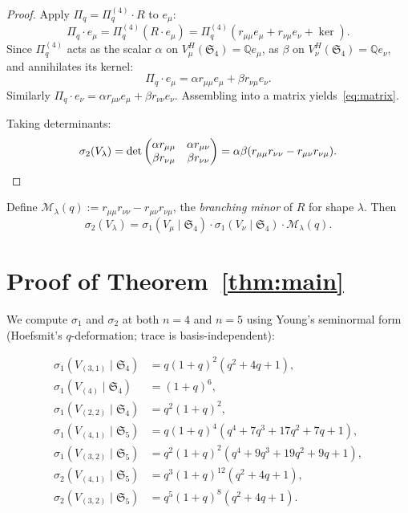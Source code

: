 \documentclass[11pt]{article}
\theoremstyle{plain}
\theoremstyle{definition}
\theoremstyle{remark}
\newcommand{\Q}{\mathbb{Q}}
\newcommand{\Sym}{\mathfrak{S}}
\newcommand{\Pibs}{\Pi_q}
\begin{document}
\begin{proof}
Apply $\Pibs = \Pibs^{(4)} \cdot R$ to $e_\mu$:
\[ \Pibs \cdot e_\mu = \Pibs^{(4)} (R \cdot e_\mu) = \Pibs^{(4)}(r_{\mu\mu} e_\mu + r_{\nu\mu} e_\nu + \ker). \]
Since $\Pibs^{(4)}$ acts as the scalar $\alpha$ on $V_\mu^H(\Sym_4) = \Q e_\mu$,
as $\beta$ on $V_\nu^H(\Sym_4) = \Q e_\nu$, and annihilates its kernel:
\[ \Pibs \cdot e_\mu = \alpha r_{\mu\mu} e_\mu + \beta r_{\nu\mu} e_\nu. \]
Similarly $\Pibs \cdot e_\nu = \alpha r_{\mu\nu} e_\mu + \beta r_{\nu\nu} e_\nu$.
Assembling into a matrix yields~\eqref{eq:matrix}.

Taking determinants:
\[ \sigma_2(V_\lambda) = \det \begin{pmatrix} \alpha r_{\mu\mu} & \alpha r_{\mu\nu} \\ \beta r_{\nu\mu} & \beta r_{\nu\nu} \end{pmatrix} = \alpha \beta (r_{\mu\mu} r_{\nu\nu} - r_{\mu\nu} r_{\nu\mu}). \qedhere \]
\end{proof}

Define $\mathcal{M}_\lambda(q) := r_{\mu\mu} r_{\nu\nu} - r_{\mu\nu} r_{\nu\mu}$,
the \emph{branching minor} of $R$ for shape $\lambda$. Then
\begin{equation}\sigma_2(V_\lambda) = \sigma_1(V_\mu \mid \Sym_4) \cdot \sigma_1(V_\nu \mid \Sym_4) \cdot \mathcal{M}_\lambda(q). \label{eq:factorization}\end{equation}

\section{Proof of Theorem~\ref{thm:main}}

We compute $\sigma_1$ and $\sigma_2$ at both $n = 4$ and $n = 5$ using Young's
seminormal form (Hoefsmit's $q$-deformation; trace is basis-independent):

\begin{align*}
\sigma_1(V_{(3,1)} \mid \Sym_4) &= q (1+q)^2 (q^2 + 4q + 1), \\
\sigma_1(V_{(4)} \mid \Sym_4) &= (1+q)^6, \\
\sigma_1(V_{(2,2)} \mid \Sym_4) &= q^2 (1+q)^2, \\
\sigma_1(V_{(4,1)} \mid \Sym_5) &= q (1+q)^4 (q^4 + 7q^3 + 17q^2 + 7q + 1), \\
\sigma_1(V_{(3,2)} \mid \Sym_5) &= q^2 (1+q)^2 (q^4 + 9q^3 + 19q^2 + 9q + 1), \\
\sigma_2(V_{(4,1)} \mid \Sym_5) &= q^3 (1+q)^{12} (q^2 + 4q + 1), \\
\sigma_2(V_{(3,2)} \mid \Sym_5) &= q^5 (1+q)^{8} (q^2 + 4q + 1).
\end{align*}
\end{document}
